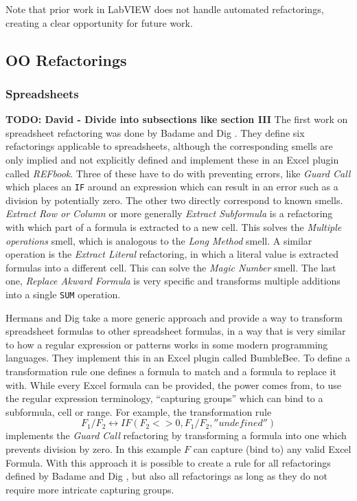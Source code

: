 \documentclass[10pt,conference,compsocconf]{IEEEtran}
\newcommand{\todo}[1]{\textbf{TODO: #1}}
\begin{document}
Note that prior work in LabVIEW does not handle automated refactorings, creating a clear opportunity for future work. 

\subsection{OO Refactorings}

\subsubsection{Spreadsheets}
\todo{David - Divide into subsections like section III}
The first work on spreadsheet refactoring was done by Badame and Dig \cite{badame2012refactoring}.
They define six refactorings applicable to spreadsheets, although the corresponding smells are only implied and not explicitly defined and implement these in an Excel plugin called \textit{REFbook}.
Three of these have to do with preventing errors, like \textit{Guard Call} which places an \texttt{IF} around an expression which can result in an error such as a division by potentially zero.
The other two directly correspond to known smells.
\textit{Extract Row or Column} or more generally \textit{Extract Subformula} is a refactoring with which part of a formula is extracted to a new cell.
This solves the \textit{Multiple operations} smell, which is analogous to the \textit{Long Method} \cite{Hermans2012intra} smell.
A similar operation is the \textit{Extract Literal} refactoring, in which a literal value is extracted formulas into a different cell.
This can solve the \textit{Magic Number} smell.
The last one, \textit{Replace Akward Formula} is very specific and transforms multiple additions into a single \texttt{SUM} operation.

Hermans and Dig \cite{hermans2014bumblebee} take a more generic approach and provide a way to transform spreadsheet formulas to other spreadsheet formulas, in a way that is very similar to how a regular expression or patterns works in some modern programming languages.
They implement this in an Excel plugin called BumbleBee.
To define a transformation rule one defines a formula to match and a formula to replace it with. While every Excel formula can be provided, the power comes from, to use the regular expression terminology, ``capturing groups'' which can bind to a subformula, cell or range. For example, the transformation rule
\[F_1/F_2 \leftrightarrow IF(F_2<>0,F_1/F_2,''undefined'')\]
 implements the \textit{Guard Call} \cite{badame2012refactoring} refactoring by transforming a formula into one which prevents division by zero.
 In this example $F$ can capture (bind to) any valid Excel Formula.
 With this approach it is possible to create a rule for all refactorings defined by Badame and Dig \cite{badame2012refactoring}, but also all refactorings as long as they do not require more intricate capturing groups.
 
\end{document}

